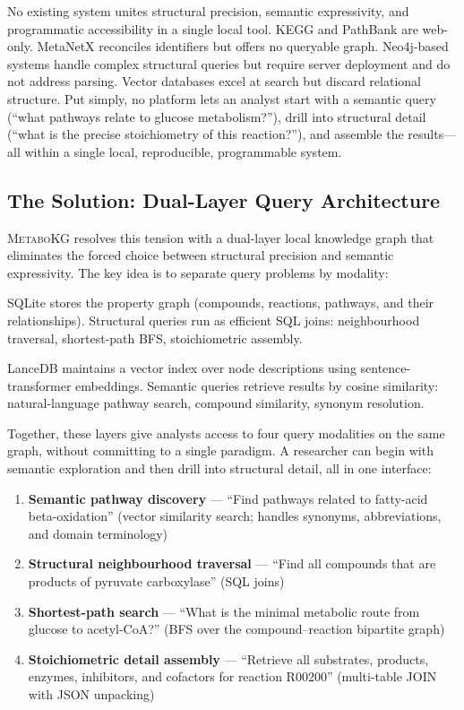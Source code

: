 \documentclass[10pt]{article}
\begin{document}
No existing system unites structural precision, semantic expressivity, and
programmatic accessibility in a single local tool. KEGG and PathBank are
web-only. MetaNetX reconciles identifiers but offers no queryable graph.
Neo4j-based systems handle complex structural queries but require server
deployment and do not address parsing. Vector databases excel at search but
discard relational structure. Put simply, no platform lets an analyst start
with a semantic query (``what pathways relate to glucose metabolism?''), drill
into structural detail (``what is the precise stoichiometry of this
reaction?''), and assemble the results---all within a single local,
reproducible, programmable system.

\subsection{The Solution: Dual-Layer Query Architecture}

\textsc{MetaboKG} resolves this tension with a dual-layer local knowledge graph
that eliminates the forced choice between structural precision and semantic
expressivity. The key idea is to separate query problems by modality:

\begin{description}[leftmargin=*,itemsep=2pt]
\item[Structural layer.] SQLite stores the property graph (compounds,
  reactions, pathways, and their relationships). Structural queries run as
  efficient SQL joins: neighbourhood traversal, shortest-path BFS,
  stoichiometric assembly.
\item[Semantic layer.] LanceDB maintains a vector index over node descriptions
  using sentence-transformer embeddings. Semantic queries retrieve results by
  cosine similarity: natural-language pathway search, compound similarity,
  synonym resolution.
\end{description}

Together, these layers give analysts access to four query modalities on the
same graph, without committing to a single paradigm. A researcher can begin
with semantic exploration and then drill into structural detail, all in one
interface:

\begin{enumerate}[leftmargin=*, itemsep=2pt]
\item \textbf{Semantic pathway discovery} --- ``Find pathways related to
  fatty-acid beta-oxidation'' (vector similarity search; handles synonyms,
  abbreviations, and domain terminology)
\item \textbf{Structural neighbourhood traversal} --- ``Find all compounds
  that are products of pyruvate carboxylase'' (SQL joins)
\item \textbf{Shortest-path search} --- ``What is the minimal metabolic route
  from glucose to acetyl-CoA?'' (BFS over the compound--reaction bipartite
  graph)
\item \textbf{Stoichiometric detail assembly} --- ``Retrieve all substrates,
  products, enzymes, inhibitors, and cofactors for reaction R00200''
  (multi-table JOIN with JSON unpacking)
\end{enumerate}
\end{document}
